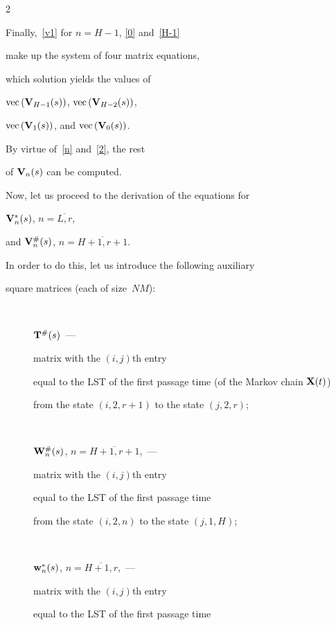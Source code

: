 \begin{multicols}{2}
\noindent 


Finally,~\eqref{v1} for $n=H-1$, \eqref{0} and~\eqref{H-1}


make up the system of four matrix equations,


which solution yields the values of 


$\mathrm{vec}\,(\mathbf{V}_{H-1}(s))$, $\mathrm{vec}\,(\mathbf{V}_{H-2}(s))$,


$\mathrm{vec}\,(\mathbf{V}_{1}(s))$, and $\mathrm{vec}\,(\mathbf{V}_{0}(s))$.


By virtue of~\eqref{n} and~\eqref{2}, the rest 


of $\mathbf{V}_{n}(s)$ can be computed.





Now, let us proceed to the derivation of the equations for 


$\mathbf{V}^*_{n}(s)$, $n=\overline{L,r}$,


and $\mathbf{V}^{\#}_{n}(s)$, $n=\overline{H+1,r+1}$.


In order to do this, let us introduce the following auxiliary 


square matrices (each of size~$NM$):


\begin{description}


\item[\,] $\mathbf{T}^{\#}(s)$~---  


matrix with the  $(i,j)${th} entry 


equal to the LST of the first passage time (of the Markov chain ${\bf{X}}(t)$)


from the state $(i,2,r+1)$ to the state $(j,2,r)$;


\item[\,] 


$\mathbf{W}^{\#}_n(s)$, $n=\overline{H+1,r+1}$,~---


matrix with the $(i,j)${th} entry 


equal to the LST of the first passage time 


from the state $(i,2,n)$ to the state $(j,1,H)$;





\item[\,] 


$\mathbf{w}^*_n(s)$, $n=\overline{H+1,r}$,~---


matrix with the $(i,j)${th} entry 


equal to the LST of the first passage time 



\end{description}
\end{multicols}
